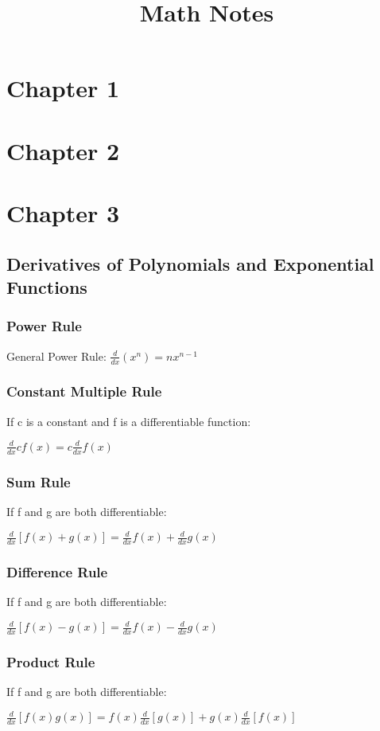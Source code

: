 \documentclass[10pt,a4paper]{article}
\title{Math Notes}
\begin{document}
	\section{Chapter 1}
	
	\section{Chapter 2}
	
	\section{Chapter 3}
		\subsection{Derivatives of Polynomials and Exponential Functions}
		\subsubsection{Power Rule}
		
		General Power Rule: $\frac{d}{dx}(x^{n}) = nx^{n-1}$
		
		\subsubsection{Constant Multiple Rule}
		If c is a constant and f is a differentiable function: 
		\begin{center}
			$\frac{d}{dx}cf(x) = c\frac{d}{dx}f(x)$
		\end{center}
		\subsubsection{Sum Rule}
		If f and g are both differentiable:
		\begin{center}
			$\frac{d}{dx} [f(x)+ g(x)] = \frac{d}{dx}f(x) + \frac{d}{dx}g(x)$
		\end{center}
		\subsubsection{Difference Rule}
		If f and g are both differentiable: 
		\begin{center}
			$\frac{d}{dx}[f(x) - g(x)] = \frac{d}{dx}f(x) - \frac{d}{dx}g(x)$
		\end{center}
		\subsubsection{Product Rule}
		If f and g are both differentiable: 
		\begin{center}
			$\frac{d}{dx}[f(x)g(x)] = f(x)\frac{d}{dx}[g(x)] + g(x)\frac{d}{dx}[f(x)]$
		\end{center}
\end{document}
